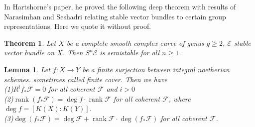 \documentclass{ctexart}
\newtheorem{theorem}{Theorem}[section]
\newtheorem{lemma}{Lemma}[section]
\newcommand{\rank}{\operatorname{rank}}
\begin{document}
In Hartshorne's paper, he proved the following deep theorem with results of Narasimhan and Seshadri relating stable vector bundles to certain group representations.
Here we quote it without proof.
\begin{theorem}
    Let $X$ be a complete smooth complex curve of genus $g \ge 2$, $\mathcal{E}$ stable vector bundle on $X$.
    Then $S^{n}\mathcal{E}$ is semistable for all $n \ge 1$.
    \label{Theorem 6.2}
\end{theorem}
\begin{lemma}
    Let $f: X \rightarrow Y$ be a finite surjection between integral noetherian schemes. sometimes called finite cover.
    Then we have \\
    (1)$R^{i}f_{\ast}\mathcal{F} = 0$ for all coherent $\mathcal{F}$ and $i > 0$ \\
    (2)$\rank (f_{\ast}\mathcal{F}) = \deg f \cdot \rank \mathcal{F}$ for all coherent $\mathcal{F}$, where $\deg f = [K(X) : K(Y)]$. \\
    (3)$\deg (f_{\ast}\mathcal{F}) = \deg \mathcal{F} + \rank \mathcal{F} \cdot \deg (f_{\ast}\mathcal{F})$ for all coherent $\mathcal{F}$.
    \label{Lemma 6.5} 
\end{lemma}
\end{document}
